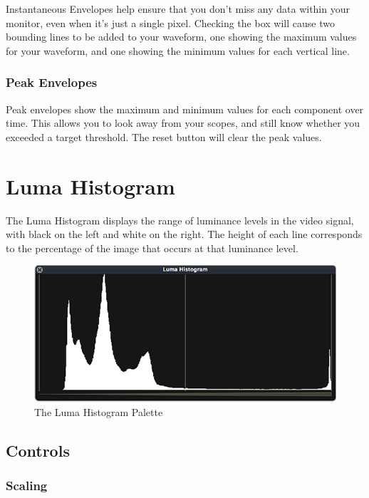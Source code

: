 \documentclass[10,letterpaper,]{report}
\begin{document}
Instantaneous Envelopes help ensure that you don't miss any data within
your monitor, even when it's just a single pixel. Checking the box will
cause two bounding lines to be added to your waveform, one showing the
maximum values for your waveform, and one showing the minimum values for
each vertical line.

\subsection{Peak Envelopes}

Peak envelopes show the maximum and minimum values for each component
over time. This allows you to look away from your scopes, and still know
whether you exceeded a target threshold. The reset button will clear the
peak values.

\chapter{Luma Histogram}

The Luma Histogram displays the range of luminance levels in the video
signal, with black on the left and white on the right. The height of
each line corresponds to the percentage of the image that occurs at that
luminance level.

\begin{figure}[htbp]
\centering
\includegraphics{images/LumaHistogram.png}
\caption{The Luma Histogram Palette}
\end{figure}

\section{Controls}

\subsection{Scaling}
\end{document}
